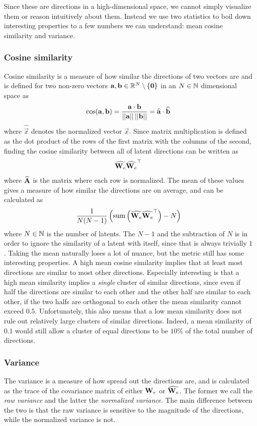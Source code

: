Since these are directions in a high-dimensional space, we cannot simply visualize them or reason intuitively about them.
Instead we use two statistics to boil down interesting properties to a few numbers we can understand: mean cosine similarity and variance.

\subsubsection{Cosine similarity}
Cosine similarity is a measure of how similar the directions of two vectors are and is defined for two non-zero vectors $\mathbf{a},\mathbf{b}\in\mathbb{R}^{N}\setminus \{\mathbf{0}\}$ in an $N\in\mathbb{N}$ dimensional space as
\begin{align*}
    \cos(\mathbf{a},\mathbf{b})=\frac{\mathbf{a}\cdot\mathbf{b}}{\left\lvert\left\lvert\mathbf{a}\right\lvert\right\lvert\left\lvert\left\lvert\mathbf{b}\right\lvert\right\lvert}=\widehat{\mathbf{a}}\cdot\widehat{\mathbf{b}}
\end{align*}
where $\widehat{\vec x}$ denotes the normalized vector $\vec x$.
Since matrix multiplication is defined as the dot product of the rows of the first matrix with the columns of the second, finding the cosine similarity between all of latent directions can be written as
\begin{align*}
    \widehat{\mathbf{W}_e}\widehat{\mathbf{W}_e}^\top
\end{align*}
where $\widehat{\mathbf{A}}$ is the matrix where each row is normalized.
The mean of these values gives a measure of how similar the directions are on average, and can be calculated as 
\begin{align*}
    \frac1{N(N-1)}\left(\mathrm{sum}\left(\widehat{\mathbf{W}_e}\widehat{\mathbf{W}_e}^\top\right)-N\right)
\end{align*}
where $N\in\mathbb{N}$ is the number of latents.
The $N-1$ and the subtraction of $N$ is in order to ignore the similarity of a latent with itself, since that is always trivially $1$.
Taking the mean naturally loses a lot of nuance, but the metric still has some interesting properties.
A high mean cosine similarity implies that at least most directions are similar to most other directions.
Especially interesting is that a high mean similarity implies a \emph{single} cluster of similar directions, since even if half the directions are similar to each other and the other half are similar to each other, if the two halfs are orthogonal to each other the mean similarity cannot exceed $0.5$.
Unfortunately, this also means that a low mean similarity does not rule out relatively large clusters of similar directions.
Indeed, a mean similarity of $0.1$ would still allow a cluster of equal directions to be $10\%$ of the total number of directions.

\subsubsection{Variance}
The variance is a measure of how spread out the directions are, and is calculated as the trace of the covariance matrix of either $\mathbf{W}_e$ or $\widehat{\mathbf{W}_e}$.
The former we call the \emph{raw variance} and the latter the \emph{normalized variance}.
The main difference between the two is that the raw variance is sensitive to the magnitude of the directions, while the normalized variance is not.
